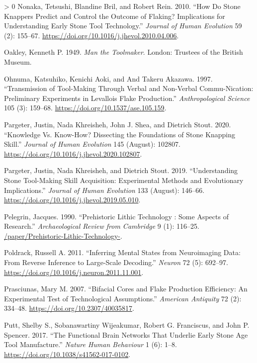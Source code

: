 \documentclass[smallextended]{svjour3}       %
\newlength{\cslhangindent}
\newenvironment{CSLReferences}[3] %
 {%
  \setlength{\parindent}{0pt}
  \ifodd #1 \everypar{\setlength{\hangindent}{\cslhangindent}}\ignorespaces\fi
  \ifnum #2 > 0
  \setlength{\parskip}{#3\baselineskip}
  \fi
 }%
 {}
\begin{document}
\begin{CSLReferences}{1}{0}
\leavevmode\hypertarget{ref-nonaka2010}{}%
Nonaka, Tetsushi, Blandine Bril, and Robert Rein. 2010. {``How Do Stone
Knappers Predict and Control the Outcome of Flaking? Implications for
Understanding Early Stone Tool Technology.''} \emph{Journal of Human
Evolution} 59 (2): 155--67.
\url{https://doi.org/10.1016/j.jhevol.2010.04.006}.

\leavevmode\hypertarget{ref-oakley1949}{}%
Oakley, Kenneth P. 1949. \emph{Man the Toolmaker}. London: Trustees of
the British Museum.

\leavevmode\hypertarget{ref-ohnuma1997}{}%
Ohnuma, Katsuhiko, Kenichi Aoki, and And Takeru Akazawa. 1997.
{``Transmission of Tool-Making Through Verbal and Non-Verbal
Commu-Nication: Preliminary Experiments in Levallois Flake
Production.''} \emph{Anthropological Science} 105 (3): 159--68.
\url{https://doi.org/10.1537/ase.105.159}.

\leavevmode\hypertarget{ref-pargeter2020}{}%
Pargeter, Justin, Nada Khreisheh, John J. Shea, and Dietrich Stout.
2020. {``Knowledge Vs. Know-How? Dissecting the Foundations of Stone
Knapping Skill.''} \emph{Journal of Human Evolution} 145 (August):
102807. \url{https://doi.org/10.1016/j.jhevol.2020.102807}.

\leavevmode\hypertarget{ref-pargeter2019}{}%
Pargeter, Justin, Nada Khreisheh, and Dietrich Stout. 2019.
{``Understanding Stone Tool-Making Skill Acquisition: {Experimental}
Methods and Evolutionary Implications.''} \emph{Journal of Human
Evolution} 133 (August): 146--66.
\url{https://doi.org/10.1016/j.jhevol.2019.05.010}.

\leavevmode\hypertarget{ref-pelegrin1990}{}%
Pelegrin, Jacques. 1990. {``Prehistoric Lithic Technology : Some Aspects
of Research.''} \emph{Archaeological Review from Cambridge} 9 (1):
116--25.
\href{https:///paper/Prehistoric-Lithic-Technology-}{/paper/Prehistoric-Lithic-Technology-}.

\leavevmode\hypertarget{ref-poldrack2011}{}%
Poldrack, Russell A. 2011. {``Inferring Mental States from Neuroimaging
Data: From Reverse Inference to Large-Scale Decoding.''} \emph{Neuron}
72 (5): 692--97. \url{https://doi.org/10.1016/j.neuron.2011.11.001}.

\leavevmode\hypertarget{ref-prasciunas2007}{}%
Prasciunas, Mary M. 2007. {``Bifacial Cores and Flake Production
Efficiency: An Experimental Test of Technological Assumptions.''}
\emph{American Antiquity} 72 (2): 334--48.
\url{https://doi.org/10.2307/40035817}.

\leavevmode\hypertarget{ref-putt2017}{}%
Putt, Shelby S., Sobanawartiny Wijeakumar, Robert G. Franciscus, and
John P. Spencer. 2017. {``The Functional Brain Networks That Underlie
Early Stone Age Tool Manufacture.''} \emph{Nature Human Behaviour} 1
(6): 1--8. \url{https://doi.org/10.1038/s41562-017-0102}.


\end{CSLReferences}
\end{document}

